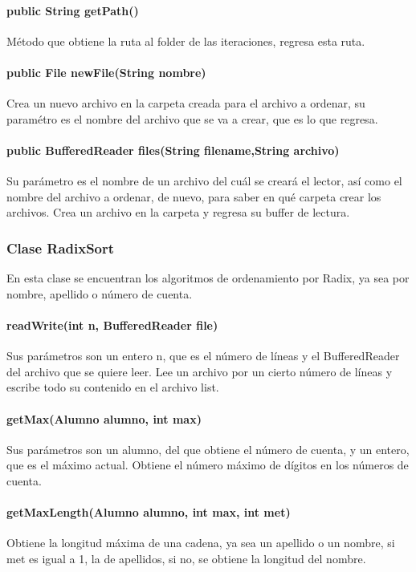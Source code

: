 \documentclass[11pt]{article}
\begin{document}
\paragraph{public String getPath()}
Método que obtiene la ruta al folder de las iteraciones, regresa esta ruta. 

\paragraph{public File newFile(String nombre)}
Crea un nuevo archivo en la carpeta creada para el archivo a ordenar, su paramétro es el nombre del archivo que se va a crear, que es lo que regresa. 

\paragraph{public BufferedReader files(String filename,String archivo) }
Su parámetro es el nombre de un archivo del cuál se creará el lector, así como el nombre del archivo a ordenar, de nuevo, para saber en qué carpeta crear los archivos. Crea un archivo en la carpeta y regresa su buffer de lectura.  

\subsubsection{Clase RadixSort}
En esta clase se encuentran los algoritmos de ordenamiento por Radix, ya sea por nombre, apellido o número de cuenta. 

\paragraph{readWrite(int n, BufferedReader file)} 
Sus parámetros son un entero n, que es el número de líneas y el BufferedReader del archivo que se quiere leer. Lee un archivo por un cierto número de líneas y escribe todo su contenido en el archivo list.

\paragraph{getMax(Alumno alumno, int max)}
Sus parámetros son un alumno, del que obtiene el número de cuenta, y un entero, que es el máximo actual. Obtiene el número máximo de dígitos en los números de cuenta. 

\paragraph{getMaxLength(Alumno alumno, int max, int met)}
Obtiene la longitud máxima de una cadena, ya sea un apellido o un nombre, si met es igual a 1, la de apellidos, si no, se obtiene la longitud del nombre. 
\end{document}
